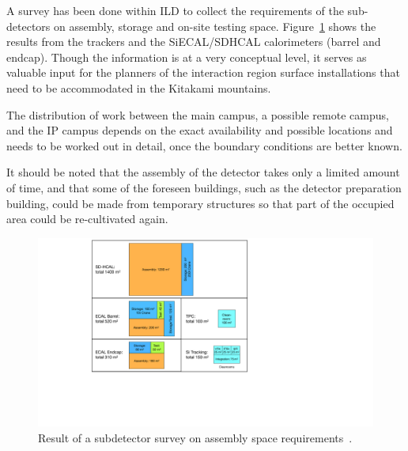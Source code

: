 A survey has been done within ILD to collect the requirements of the sub-detectors on assembly, storage and on-site testing space. Figure~\ref{fig:integration:assembly_space} shows the results from the trackers and the SiECAL/SDHCAL calorimeters (barrel and endcap). Though the information is at a very conceptual level, it serves as valuable input for the planners of the interaction region surface installations that need to be accommodated in the Kitakami mountains. 

The distribution of work between the main campus, a possible remote campus, and the IP campus depends on the exact availability and possible locations and needs to be worked out in detail, once the boundary conditions are better known.

It should be noted that the assembly of the detector takes only a limited amount of time, and that some of the foreseen buildings, such as the detector preparation building, could be made from temporary structures so that part of the occupied area could be re-cultivated again.

\begin{figure}[h!]
\centering
\includegraphics[width=0.8\hsize]{Integration/fig/Assembly_Space.pdf}
\caption{\label{fig:integration:assembly_space}Result of a subdetector survey on assembly space requirements~\cite{ild:bib:ejade_mdi,ild:bib:assembly}.}
\end{figure}

